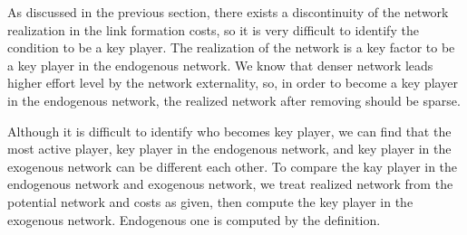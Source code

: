 \documentclass[12pt]{article}
\theoremstyle{definition}
\begin{document}
As discussed in the previous section, there exists a discontinuity of the network realization in the link formation costs, so it is very difficult to identify the condition to be a key player.
The realization of the network is a key factor to be a key player in the endogenous network.
We know that denser network leads higher effort level by the network externality, so, in order to become a key player in the endogenous network, the realized network after removing should be sparse.

Although it is difficult to identify who becomes key player, we can find that the most active player, key player in the endogenous network, and key player in the exogenous network can be different each other.
To compare the kay player in the endogenous network and exogenous network, we treat realized network from the potential network and costs as given, then compute the key player in the exogenous network.
Endogenous one is computed by the definition.
\end{document}
